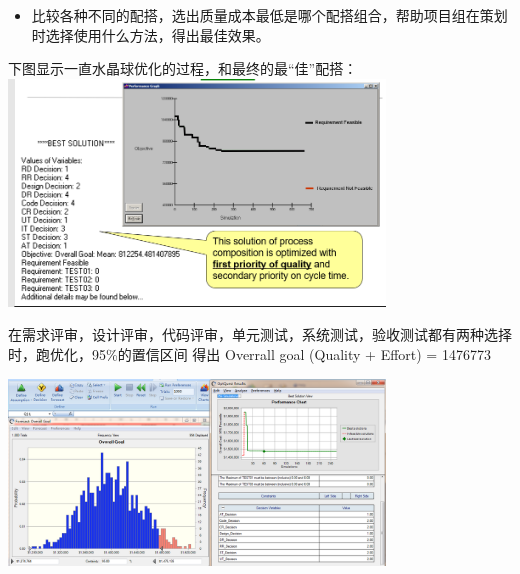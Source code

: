 \begin{itemize}
\tightlist
\item
  比较各种不同的配搭，选出质量成本最低是哪个配搭组合，帮助项目组在策划时选择使用什么方法，得出最佳效果。
\end{itemize}

下图显示一直水晶球优化的过程，和最终的最``佳''配搭：\\

\includegraphics[width=10cm]{HmttOptScreenshot_2021-10-08_165653.png}

在需求评审，设计评审，代码评审，单元测试，系统测试，验收测试都有两种选择时，跑优化，95\%的置信区间
得出 Overrall goal (Quality + Effort) = 1476773


\includegraphics[width=10cm]{微信截图_20211103023018.png}



